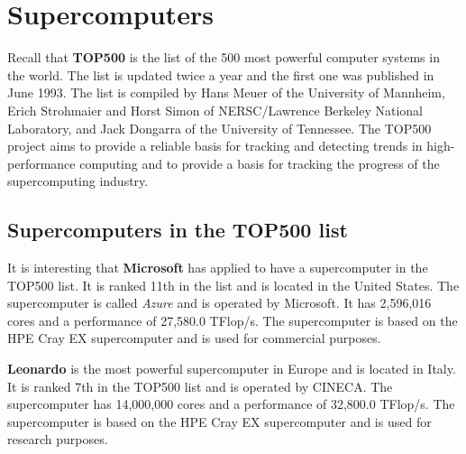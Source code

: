 \chapter{Supercomputers}

Recall that \textbf{TOP500} is the list of the 500 most powerful computer systems in the world. The list is updated twice a year and the first one was published in June 1993. The list is compiled by Hans Meuer of the University of Mannheim, Erich Strohmaier and Horst Simon of NERSC/Lawrence Berkeley National Laboratory, and Jack Dongarra of the University of Tennessee. The TOP500 project aims to provide a reliable basis for tracking and detecting trends in high-performance computing and to provide a basis for tracking the progress of the supercomputing industry.


\section{Supercomputers in the TOP500 list}
It is interesting that \textbf{Microsoft} has applied to have a supercomputer in the TOP500 list. It is ranked 11th in the list and is located in the United States. The supercomputer is called \textit{Azure} and is operated by Microsoft. It has 2,596,016 cores and a performance of 27,580.0 TFlop/s. The supercomputer is based on the HPE Cray EX supercomputer and is used for commercial purposes.

\textbf{Leonardo} is the most powerful supercomputer in Europe and is located in Italy. It is ranked 7th in the TOP500 list and is operated by CINECA. The supercomputer has 14,000,000 cores and a performance of 32,800.0 TFlop/s. The supercomputer is based on the HPE Cray EX supercomputer and is used for research purposes.


